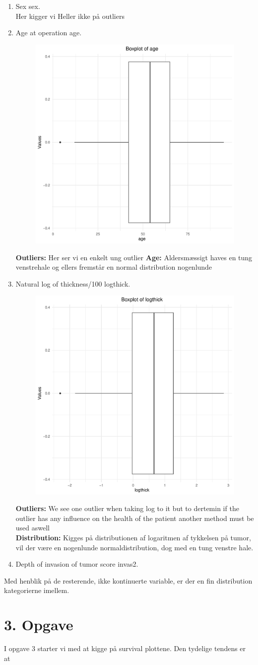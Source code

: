 \begin{enumerate}
\item Sex sex.\\
Her kigger vi Heller ikke på outliers
\item Age at operation age.
\newline
\begin{figure}[h]
    \centering
    \includegraphics[width=0.6\linewidth]{Basses_kode/Billeder_duration/Boxplot_of_ age .pdf}
\end{figure}
\textbf{Outliers: }Her ser vi en enkelt ung outlier 
\textbf{Age: } Aldersmæssigt haves en tung venstrehale og ellers fremstår en normal distribution nogenlunde
\newpage
\item Natural log of thickness/100 logthick.
\newline
\begin{figure}[h]
    \centering
    \includegraphics[width=0.6\linewidth]{Basses_kode/Billeder_duration/Boxplot_of_ logthick .pdf}
\end{figure}
\textbf{Outliers: }We see one outlier when taking log to it but to dertemin if the outlier has any influence on the health of the patient another method must be used aswell\\
\textbf{Distribution: }Kigges på distributionen af logaritmen af tykkelsen på tumor, vil der være en nogenlunde normaldistribution, dog med en tung venstre hale.
\item Depth of invasion of tumor score invas2.
\end{enumerate}

Med henblik på de resterende, ikke kontinuerte variable, er der en fin distribution kategorierne imellem.



\chapter{3. Opgave}
I opgave 3 starter vi med at kigge på survival plottene. Den tydelige tendens er at 